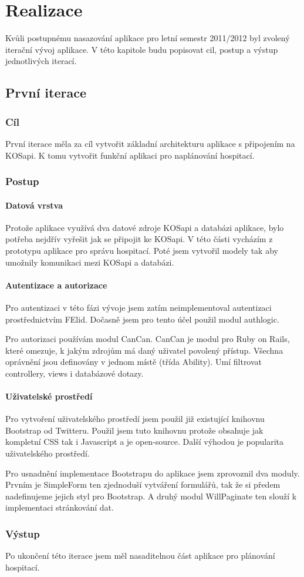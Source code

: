 \chapter{Realizace}
Kvůli postupnému nasazování aplikace pro letní semestr 2011/2012 byl zvolený iterační vývoj aplikace. V této kapitole budu popisovat cil, postup a výstup jednotlivých iterací.

\section{První iterace}
\subsection{Cíl}
První iterace měla za cíl vytvořit základní architekturu aplikace s připojením na KOSapi. K tomu vytvořit funkční aplikaci pro naplánování hospitací.

\subsection{Postup}
\subsubsection{Datová vrstva}
Protože aplikace využívá dva datové zdroje KOSapi a databázi aplikace, bylo potřeba nejdřív vyřešit jak se připojit ke KOSapi. V této části vycházím z prototypu aplikace pro správu hospitací. Poté jsem vytvořil modely tak aby umožnily komunikaci mezi KOSapi a databázi.

\subsubsection{Autentizace a autorizace}
Pro autentizaci v této fázi vývoje jsem zatím neimplementoval autentizaci prostřednictvím FElid. Dočasně jsem pro tento účel použil modul authlogic.

Pro autorizaci používám modul CanCan. CanCan je modul pro Ruby on Rails, které omezuje, k jakým zdrojům má daný uživatel povolený přístup. Všechna oprávnění jsou definovány v jednom místě (třída Ability). Umí filtrovat controllery, views i databázové dotazy.

\subsubsection{Uživatelské prostředí}
Pro vytvoření uživatelského prostředí jsem použil již existující knihovnu Bootstrap od Twitteru. Použil jsem tuto knihovnu protože obsahuje jak kompletní CSS tak i Javascript a je open-source. Další výhodou je popularita uživatelského prostředí.

Pro usnadnění implementace Bootstrapu do aplikace jsem zprovoznil dva moduly. Prvním je SimpleForm ten zjednoduší vytváření formulářů, tak že si předem nadefinujeme jejich styl pro Bootstrap. A druhý modul WillPaginate ten slouží k implementaci stránkování dat.

\subsection{Výstup} 
Po ukončení této iterace jsem měl nasaditelnou část aplikace pro plánování hospitací.
